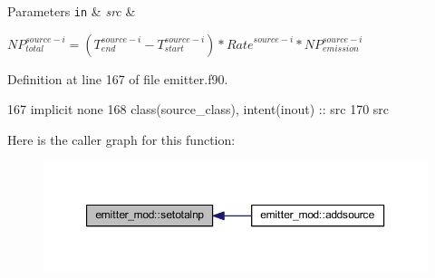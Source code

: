 \begin{DoxyParams}[1]{Parameters}
\mbox{\tt in}  & {\em src} & \\
\hline
\end{DoxyParams}
${NP}_{total}^{source-i}=(T_{end}^{source-i}-T_{start}^{source-i})*{Rate}^{source-i}*{NP}_{emission}^{source-i}$ 

Definition at line 167 of file emitter.\+f90.


\begin{DoxyCode}
167     \textcolor{keywordtype}{implicit none}
168     \textcolor{keywordtype}{class}(source\_class), \textcolor{keywordtype}{intent(inout)} :: src
170     src%
\end{DoxyCode}
Here is the caller graph for this function\+:\nopagebreak
\begin{figure}[H]
\begin{center}
\leavevmode
\includegraphics[width=350pt]{namespaceemitter__mod_a5c219dd6692a761ad4bf968ae750fcc6_icgraph}
\end{center}
\end{figure}
